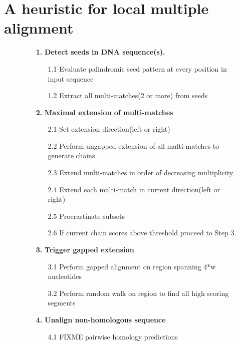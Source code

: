 \documentclass{llncs}
\begin{document}
\section{A heuristic for local multiple alignment}
\begin{figure}[t]
\begin{center}
\hfill
\scriptsize
\begin{minipage}[t]{.50\textwidth}
\begin{flushleft}

\begin{enumerate}
\item[\textbf{1.}] \textbf{Detect seeds in DNA sequence(s).}
\begin{enumerate}

\item[1.1] Evaluate palindromic seed pattern at every position in input sequence
\item[1.2] Extract all multi-matches(2 or more) from seeds
\end{enumerate}
\item[\textbf{2.}] \textbf{Maximal extension of multi-matches}
\begin{enumerate}

\item[2.1] Set extension direction(left or right)
\item[2.2] Perform ungapped extension of all multi-matches to generate chains
\item[2.3] Extend multi-matches in order of decreasing multiplicity
\item[2.4] Extend each multi-match in current direction(left or right)
\item[2.5] Procrastinate subsets
\item[2.6] If current chain scores above threshold proceed to Step 3.
\end{enumerate}
\item[\textbf{3.}] \textbf{Trigger gapped extension}
\begin{enumerate}
\item[3.1] Perform gapped alignment on region spanning 4*w nucleotides
\item[3.2] Perform random walk on region to find all high scoring segments
\end{enumerate}
\item[\textbf{4.}] \textbf{Unalign non-homologous sequence}
\begin{enumerate}
\item[4.1] FIXME pairwise homology predictions
\end{enumerate}


\end{enumerate}
\end{flushleft}
\end{minipage}
\end{center}
\end{figure}
\end{document}

